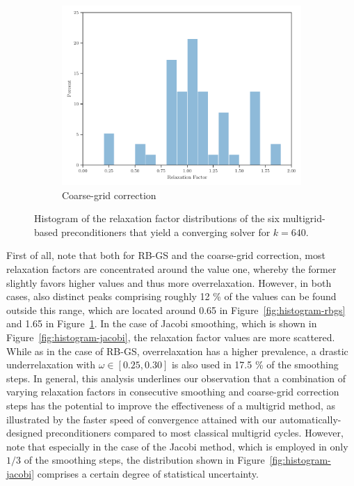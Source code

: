 \begin{figure}
\begin{subfigure}[b]{0.495\columnwidth}
    \includegraphics[width=\columnwidth]{figures/histogram_cgc.pdf}
	\caption{Coarse-grid correction}
	\label{fig:histogram-cgc}
\end{subfigure}
    \caption{Histogram of the relaxation factor distributions of the six multigrid-based preconditioners that yield a converging solver for $k = 640$.}
    \label{fig:histograms}
\end{figure}
First of all, note that both for RB-GS and the coarse-grid correction, most relaxation factors are concentrated around the value one, whereby the former slightly favors higher values and thus more overrelaxation.
However, in both cases, also distinct peaks comprising roughly 12 \% of the values can be found outside this range, which are located around 0.65 in Figure~\ref{fig:histogram-rbgs} and 1.65 in Figure~\ref{fig:histogram-cgc}.
In the case of Jacobi smoothing, which is shown in Figure~\ref{fig:histogram-jacobi}, the relaxation factor values are more scattered. 
While as in the case of RB-GS, overrelaxation has a higher prevalence, a drastic underrelaxation with $\omega \in \left[0.25, 0.30\right]$ is also used in 17.5 \% of the smoothing steps.
In general, this analysis underlines our observation that a combination of varying relaxation factors in consecutive smoothing and coarse-grid correction steps has the potential to improve the effectiveness of a multigrid method, as illustrated by the faster speed of convergence attained with our automatically-designed preconditioners compared to most classical multigrid cycles. 
However, note that especially in the case of the Jacobi method, which is employed in only $1/3$ of the smoothing steps, the distribution shown in Figure~\ref{fig:histogram-jacobi} comprises a certain degree of statistical uncertainty.


